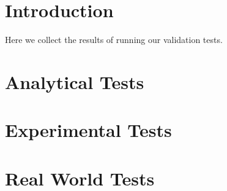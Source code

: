 \documentclass[11pt,a4paper]{report}
\begin{document}
 

\chapter{Introduction}

Here we collect the results of running our validation tests. 

\chapter{Analytical Tests}


\chapter{Experimental Tests}


\chapter{Real World Tests}

\end{document}
